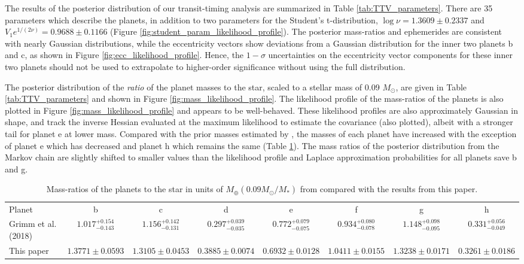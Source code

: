 \documentclass[twocolumn]{aastex63}
\begin{document}
The results of the posterior distribution of our transit-timing analysis are summarized
in Table \ref{tab:TTV_parameters}.
There are 35 parameters
which describe the planets, in addition to two parameters
for the Student's t-distribution, $ \log{\nu} = 1.3609 \pm 0.2337$
and $ V_1 e^{1/(2\nu)} = 0.9688 \pm 0.1166$ (Figure \ref{fig:student_param_likelihood_profile}).  The posterior mass-ratios
and ephemerides are consistent with nearly Gaussian distributions, while the
eccentricity vectors show deviations from a Gaussian distribution for the inner
two planets b and c, as shown in Figure \ref{fig:ecc_likelihood_profile}.  Hence, the $1-\sigma$ uncertainties
on the eccentricity vector components for these inner two planets
should not be used to extrapolate to higher-order significance
without using the full distribution.

The posterior distribution of the {\it ratio} of the planet masses to the star, scaled to a stellar mass of 0.09 $M_\odot$, are given in Table \ref{tab:TTV_parameters} and shown in Figure \ref{fig:mass_likelihood_profile}.  The likelihood profile of
the mass-ratios of the planets is also plotted in
Figure \ref{fig:mass_likelihood_profile} and appears to be well-behaved. These
likelihood profiles are also approximately Gaussian in shape, and track the inverse Hessian evaluated at the maximum likelihood to estimate the covariance (also plotted), albeit with a stronger
tail for planet e at lower mass.  Compared with the prior masses
estimated by \citet{Grimm2018}, the masses of each planet have increased
with the exception of planet e which has decreased and planet h which remains the same (Table \ref{tab:grimm_vs_agol}).   The mass ratios of the posterior distribution from the Markov chain  are slightly shifted to smaller values than the likelihood profile and Laplace approximation probabilities for all planets save b and g.

\begin{table}
    \centering
    \scriptsize
    \caption{Mass-ratios of the planets to the star in units of
        $M_\oplus (0.09 M_\odot/M_*)$ from \citet{Grimm2018} compared with the results from this paper.}
    \begin{tabular}{l|c|c|c|c|c|c|c}
        Planet              & b                          & c                           & d                           & e                           & f                           & g                           & h                           \\
        Grimm et al. (2018) & $1.017_{-0.143}^{+ 0.154}$ & $1.156_{- 0.131 }^{+0.142}$ & $0.297_{- 0.035}^{+ 0.039}$ & $0.772_{- 0.075}^{+ 0.079}$ & $0.934_{- 0.078 }^{+0.080}$ & $1.148_{- 0.095}^{+ 0.098}$ & $0.331_{- 0.049}^{+ 0.056}$ \\
        This paper          & $1.3771{\pm} 0.0593$       & $1.3105{\pm}0.0453$         & $0.3885{\pm}0.0074$         & $0.6932{\pm}0.0128$         & $1.0411{\pm}0.0155$         & $1.3238{\pm}0.0171$         & $0.3261{\pm}0.0186$         \\
    \end{tabular}

    \label{tab:grimm_vs_agol}
\end{table}
\end{document}
